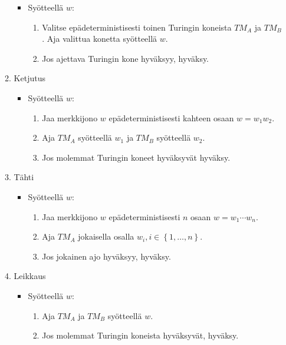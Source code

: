 \documentclass[finnish,11pt,draft]{article}
\newcommand{\set}[1]{{\left\{ #1 \right\}}}
\begin{document}
\begin{enumerate}
\begin{enumerate}
    \begin{itemize}
    \item
      Syötteellä $w$:
      \begin{enumerate}[label=\arabic*.]
      \item
        Valitse epädeterministisesti toinen Turingin koneista $TM_A$ ja
        $TM_B$. Aja valittua konetta syötteellä $w$.
      \item
        Jos ajettava Turingin kone hyväksyy, hyväksy.
      \end{enumerate}
    \end{itemize}
  \item Ketjutus
    \begin{itemize}
    \item
      Syötteellä $w$:
      \begin{enumerate}[label=\arabic*.]
      \item
        Jaa merkkijono $w$ epädeterministisesti kahteen osaan $w = w_1w_2$.
      \item
        Aja $TM_A$ syötteellä $w_1$ ja $TM_B$ syötteellä $w_2$.
      \item
        Jos molemmat Turingin koneet hyväksyvät hyväksy.
      \end{enumerate}
    \end{itemize}
  \item Tähti
    \begin{itemize}
    \item
      Syötteellä $w$:
      \begin{enumerate}[label=\arabic*.]
      \item
        Jaa merkkijono $w$ epädeterministisesti $n$ osaan $w = w_1 \cdots
        w_n$.
      \item
        Aja $TM_A$ jokaisella osalla $w_i, i \in \set{1, \dots, n}$.
      \item
        Jos jokainen ajo hyväksyy, hyväksy.
      \end{enumerate}
    \end{itemize}
  \item Leikkaus
    \begin{itemize}
    \item
      Syötteellä $w$:
      \begin{enumerate}[label=\arabic*.]
      \item
        Aja $TM_A$ ja $TM_B$ syötteellä $w$.
      \item
        Jos molemmat Turingin koneista hyväksyvät, hyväksy.
      \end{enumerate}
    \end{itemize}
  \end{enumerate}
\end{enumerate}
\end{document}
